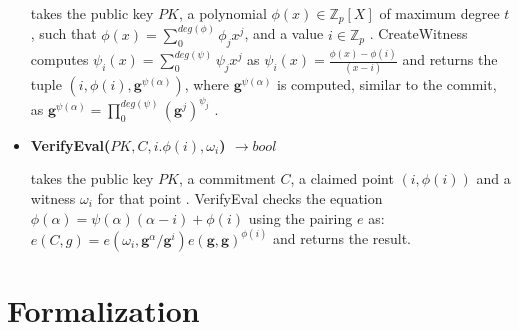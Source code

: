 \begin{itemize}
    takes the public key $PK$, a polynomial $\phi(x) \in \mathbb{Z}_p[X]$ of maximum degree $t$, such that $\phi(x)=\sum_{0}^{deg(\phi)}\phi_jx^j$, and a value $i\in\mathbb{Z}_p$ \parencite{KZG}. CreateWitness computes $\psi_i(x)=\sum_{0}^{deg(\psi)}\psi_jx^j$ as $\psi_i(x)=\frac{\phi(x)-\phi(i)}{(x-i)}$ and returns the tuple $(i,\phi(i),\mathbf{g}^{\psi(\alpha)})$, where $\mathbf{g}^{\psi(\alpha)}$ is computed, similar to the commit, as $\mathbf{g}^{\psi(\alpha)} = \prod_{0}^{deg(\psi)}(\mathbf{g}^j)^{\psi_j}$ \parencite{KZG}.
    \item \textbf{VerifyEval($PK,C,i.\phi(i),\omega_i$) $\rightarrow bool$}

    takes the public key $PK$, a commitment $C$, a claimed point $(i,\phi(i))$ and a witness $\omega_i$ for that point \parencite{KZG}. VerifyEval checks the equation $\phi(\alpha)=\psi(\alpha)(\alpha-i)+\phi(i)$ using the pairing $e$ as: $e(C,g) = e(\omega_i,\mathbf{g}^\alpha/\mathbf{g}^i)e(\mathbf{g},\mathbf{g})^{\phi(i)}$ and returns the result.
\end{itemize}





\section{Formalization}